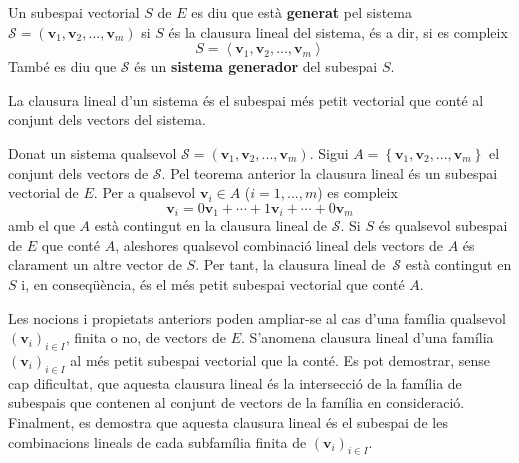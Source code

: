 \begin{definicio}
Un subespai vectorial $S$ de $E$ es diu que està 
\textbf{generat} pel sistema $\mathcal{S}=(\mathbf{v}_{1},\mathbf{v}%
_{2},...,\mathbf{v}_{m})$ si $S$ és la clausura lineal del sistema,
és a dir, si es compleix 
\begin{equation*}
S=\left\langle \mathbf{v}_{1},\mathbf{v}_{2},...,\mathbf{v}%
_{m}\right\rangle
\end{equation*}%
També es diu que $\mathcal{S}$ és un \textbf{sistema generador} del
subespai $S$.
\end{definicio}

\begin{teorema}
La clausura lineal d’un sistema és el subespai més petit vectorial que
conté al conjunt dels vectors del sistema.

\end{teorema}
\begin{prova}
Donat un sistema qualsevol $\mathcal{S}=(\mathbf{v}_{1},\mathbf{v}_{2},...,%
\mathbf{v}_{m})$. Sigui $A=\left\{ \mathbf{v}_{1},\mathbf{v}_{2},...,\mathbf{v}%
_{m}\right\} $ el conjunt dels vectors de $\mathcal{S}$. Pel teorema
anterior la clausura lineal és un subespai vectorial de $E$. Per a
qualsevol $\mathbf{v}_{i}\in A$ ($i=1,...,m$) es compleix%
\begin{equation*}
\mathbf{v}_{i}=0\mathbf{v}_{1}+\cdots +1\mathbf{v}_{i}+\cdots +0\mathbf{v}%
_{m}
\end{equation*}%
amb el que $A$ està contingut en la clausura lineal de $\mathcal{S}$. Si 
$S$ és qualsevol subespai de $E$ que conté $A$,
aleshores qualsevol combinació lineal dels vectors de $A$ és
clarament un altre vector de $S$. Per tant, la clausura lineal de\ $%
\mathcal{S}$ està contingut en $S$ i, en conseqüència, és el
més petit subespai vectorial que conté $A$.
\end{prova}

\begin{observacio}
Les nocions i propietats anteriors poden ampliar-se al cas d’una
família qualsevol $(\mathbf{v}_{i})_{i\in I}$, finita o no, de vectors de $%
E$. S’anomena clausura lineal d’una família $(\mathbf{v}_{i})_{i\in
I}$ al més petit subespai vectorial que la conté. Es pot demostrar, sense
cap dificultat, que aquesta clausura lineal és la intersecció de la
família de subespais que contenen al conjunt de vectors de la família
en consideració. Finalment, es demostra que aquesta clausura lineal és
el subespai de les combinacions lineals de cada subfamília finita de $(%
\mathbf{v}_{i})_{i\in I}$.
\end{observacio}

